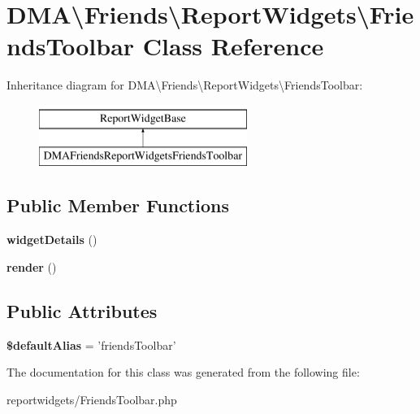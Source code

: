 \hypertarget{classDMA_1_1Friends_1_1ReportWidgets_1_1FriendsToolbar}{\section{D\+M\+A\textbackslash{}Friends\textbackslash{}Report\+Widgets\textbackslash{}Friends\+Toolbar Class Reference}
\label{classDMA_1_1Friends_1_1ReportWidgets_1_1FriendsToolbar}
}
Inheritance diagram for D\+M\+A\textbackslash{}Friends\textbackslash{}Report\+Widgets\textbackslash{}Friends\+Toolbar\+:\begin{figure}[H]
\begin{center}
\leavevmode
\includegraphics[height=2.000000cm]{d4/d8c/classDMA_1_1Friends_1_1ReportWidgets_1_1FriendsToolbar}
\end{center}
\end{figure}
\subsection*{Public Member Functions}
\begin{DoxyCompactItemize}
\item 
\hypertarget{classDMA_1_1Friends_1_1ReportWidgets_1_1FriendsToolbar_a56951946e166c46353910da4a5c399a1}{{\bfseries widget\+Details} ()}\label{classDMA_1_1Friends_1_1ReportWidgets_1_1FriendsToolbar_a56951946e166c46353910da4a5c399a1}

\item 
\hypertarget{classDMA_1_1Friends_1_1ReportWidgets_1_1FriendsToolbar_a5fb3de1ff5dd5186e068dcf8c5e8d154}{{\bfseries render} ()}\label{classDMA_1_1Friends_1_1ReportWidgets_1_1FriendsToolbar_a5fb3de1ff5dd5186e068dcf8c5e8d154}

\end{DoxyCompactItemize}
\subsection*{Public Attributes}
\begin{DoxyCompactItemize}
\item 
\hypertarget{classDMA_1_1Friends_1_1ReportWidgets_1_1FriendsToolbar_aabef17c5a99fc5f66554a91dd2cde59d}{{\bfseries \$default\+Alias} = 'friends\+Toolbar'}\label{classDMA_1_1Friends_1_1ReportWidgets_1_1FriendsToolbar_aabef17c5a99fc5f66554a91dd2cde59d}

\end{DoxyCompactItemize}


The documentation for this class was generated from the following file\+:\begin{DoxyCompactItemize}
\item 
reportwidgets/Friends\+Toolbar.\+php\end{DoxyCompactItemize}
